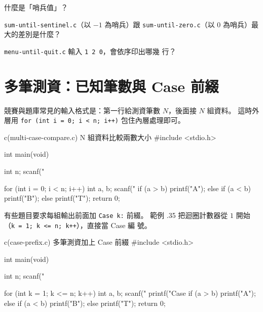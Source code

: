 

\begin{drills}[label=drills:loop-sentinel]
\item 什麼是「哨兵值」？
\item \texttt{sum-until-sentinel.c}（以 $-1$ 為哨兵）跟
\texttt{sum-until-zero.c}（以 $0$ 為哨兵）最大的差別是什麼？
\item \texttt{menu-until-quit.c} 輸入 \texttt{1 2 0}，會依序印出哪幾
行？
\end{drills}

\section{多筆測資：已知筆數與 Case 前綴}
\label{sec:loop-multi-case}

競賽與題庫常見的輸入格式是：第一行給測資筆數 $N$，後面接 $N$ 組資料。
這時外層用 \texttt{for (int i = 0; i < n; i++)} 包住內層處理即可。

\begin{example}{c}{(multi-case-compare.c) N 組資料比較兩數大小}
#include <stdio.h>

int main(void) {
    int n;
    scanf("%

    for (int i = 0; i < n; i++) {
        int a, b;
        scanf("%
        if (a > b) {
            printf("A\n");
        } else if (a < b) {
            printf("B\n");
        } else {
            printf("T\n");
        }
    }
    return 0;
}
\end{example}


有些題目要求每組輸出前面加 \texttt{Case k:} 前綴。 範例 \thechapter.35
把迴圈計數器從 $1$ 開始（\texttt{k = 1; k <= n; k++}），直接當 Case 編
號。

\begin{example}{c}{(case-prefix.c) 多筆測資加上 Case 前綴}
#include <stdio.h>

int main(void) {
    int n;
    scanf("%

    for (int k = 1; k <= n; k++) {
        int a, b;
        scanf("%
        printf("Case %
        if (a > b) {
            printf("A\n");
        } else if (a < b) {
            printf("B\n");
        } else {
            printf("T\n");
        }
    }
    return 0;
}
\end{example}

